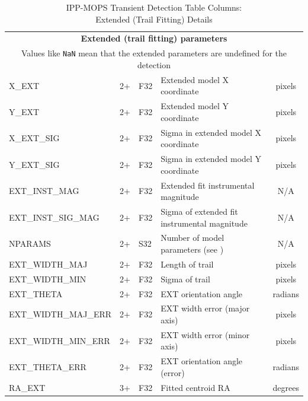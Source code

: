 \documentclass[panstarrs,spec]{panstarrs}
\begin{document}
\begin{center}
  \begin{longtable}{|lclp{3.5in}c|}
    \caption{IPP-MOPS Transient Detection Table Columns:\\ Extended (Trail Fitting) Details}\label{table-detections-ext}\\
    \hline \hline
    \multicolumn{5}{|c|}{\textbf{Extended (trail fitting) parameters}}\\
    \multicolumn{5}{|c|}{Values like \texttt{NaN} mean that the extended parameters are undefined for the detection}\\
    \hline
    X\_EXT & 2+ & F32 & 
    Extended model X coordinate & pixels\\
    \hline
    Y\_EXT & 2+ & F32 & 
    Extended model Y coordinate & pixels \\
    \hline
    X\_EXT\_SIG & 2+ & F32 & 
    Sigma in extended model X coordinate & pixels \\
    \hline
    Y\_EXT\_SIG & 2+ & F32 & 
    Sigma in extended model Y coordinate & pixels \\
    \hline
    EXT\_INST\_MAG & 2+ & F32 & 
    Extended fit instrumental magnitude & N/A \\
    \hline
    EXT\_INST\_SIG\_MAG & 2+ & F32 & 
    Sigma of extended fit instrumental magnitude & N/A \\
    \hline
    NPARAMS & 2+ & S32 & 
    Number of model parameters (see \cite{VerJedDen2012IAAaPwTF}) & N/A \\
    \hline
    EXT\_WIDTH\_MAJ & 2+ & F32 & %
    Length of trail & pixels \\  %
    \hline
    EXT\_WIDTH\_MIN & 2+ & F32 &  %
    Sigma of trail & pixels \\    %
    \hline
    EXT\_THETA & 2+ & F32 & EXT orientation angle & radians \\
    \hline
    EXT\_WIDTH\_MAJ\_ERR & 2+ & F32 & EXT width error (major axis) & pixels \\
    \hline
    EXT\_WIDTH\_MIN\_ERR & 2+ & F32 & EXT width error (minor axis) & pixels \\
    \hline
    EXT\_THETA\_ERR & 2+ & F32 & EXT orientation angle (error) & radians \\
    \hline
    RA\_EXT & 3+ & F32 & Fitted centroid RA & degrees \\

\end{longtable}
\end{center}
\end{document}
